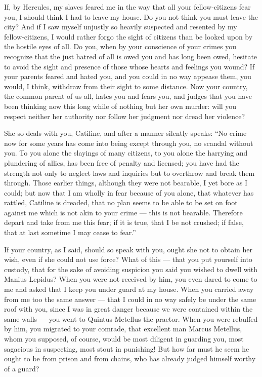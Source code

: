  If, by Hercules, my slaves feared me in the way that all your fellow-citizens fear you, I should think I had to leave my house. Do you not think you must leave the city? And if I saw myself unjustly so heavily suspected and resented by my fellow-citizens, I would rather forgo the sight of citizens than be looked upon by the hostile eyes of all. Do you, when by your conscience of your crimes you recognize that the just hatred of all is owed you and has long been owed, hesitate to avoid the sight and presence of those whose hearts and feelings you wound? If your parents feared and hated you, and you could in no way appease them, you would, I think, withdraw from their sight to some distance. Now your country, the common parent of us all, hates you and fears you, and judges that you have been thinking now this long while of nothing but her own murder: will you respect neither her authority nor follow her judgment nor dread her violence?

 She so deals with you, Catiline, and after a manner silently speaks: ``No crime now for some years has come into being except through you, no scandal without you. To you alone the slayings of many citizens, to you alone the harrying and plundering of allies, has been free of penalty and licensed; you have had the strength not only to neglect laws and inquiries but to overthrow and break them through. Those earlier things, although they were not bearable, I yet bore as I could; but now that I am wholly in fear because of you alone, that whatever has rattled, Catiline is dreaded, that no plan seems to be able to be set on foot against me which is not akin to your crime --- this is not bearable. Therefore depart and take from me this fear; if it is true, that I be not crushed; if false, that at last sometime I may cease to fear.''

 If your country, as I said, should so speak with you, ought she not to obtain her wish, even if she could not use force? What of this --- that you put yourself into custody, that for the sake of avoiding suspicion you said you wished to dwell with Manius Lepidus? When you were not received by him, you even dared to come to me and asked that I keep you under guard at my house. When you carried away from me too the same answer --- that I could in no way safely be under the same roof with you, since I was in great danger because we were contained within the same walls --- you went to Quintus Metellus the praetor. When you were rebuffed by him, you migrated to your comrade, that excellent man Marcus Metellus, whom you supposed, of course, would be most diligent in guarding you, most sagacious in suspecting, most stout in punishing! But how far must he seem he ought to be from prison and from chains, who has already judged himself worthy of a guard?

